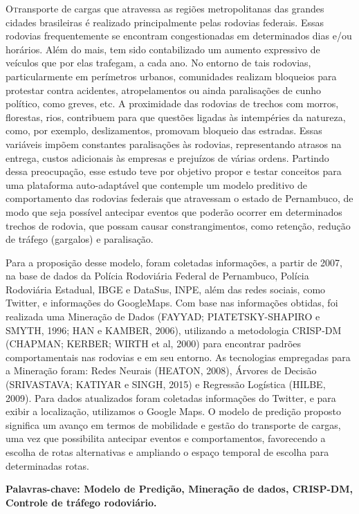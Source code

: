 \vspace*{12pt}

\lettrine {O}transporte de cargas que atravessa as regiões metropolitanas das grandes cidades brasileiras é realizado principalmente pelas rodovias federais. 
Essas rodovias frequentemente se encontram congestionadas em determinados dias e/ou horários.
Além do mais, tem sido contabilizado um aumento expressivo de veículos que por elas trafegam, a cada ano. No entorno de tais rodovias, particularmente em perímetros urbanos, comunidades realizam bloqueios para protestar contra acidentes, atropelamentos ou ainda paralisações de cunho político, como greves, etc.  A proximidade das rodovias de trechos com morros, florestas, rios, contribuem para que questões ligadas às intempéries da natureza, como, por exemplo, deslizamentos, promovam bloqueio das estradas. Essas variáveis impõem constantes paralisações às rodovias, representando atrasos na entrega, custos adicionais às empresas e prejuízos de várias ordens. 
Partindo dessa preocupação, esse estudo teve por objetivo propor e testar conceitos para uma plataforma auto-adaptável que 
contemple um modelo preditivo de comportamento das rodovias federais que atravessam o estado de Pernambuco, de modo que seja 
possível antecipar eventos que poderão ocorrer em determinados trechos de rodovia, que possam causar constrangimentos, 
como retenção, redução de tráfego (gargalos) e paralisação.

Para a proposição desse modelo, foram coletadas informações, a partir de 2007, na base de dados da Polícia Rodoviária Federal de Pernambuco, Polícia Rodoviária Estadual, IBGE e DataSus, INPE, além das redes sociais, como Twitter, e informações do GoogleMaps. 
Com base nas informações obtidas, foi realizada uma Mineração de Dados (FAYYAD; PIATETSKY-SHAPIRO e SMYTH, 1996; HAN e KAMBER, 2006), utilizando a metodologia CRISP-DM (CHAPMAN; KERBER; WIRTH et al, 2000) para encontrar padrões comportamentais nas rodovias e em seu entorno. As tecnologias empregadas para a Mineração foram: Redes Neurais (HEATON, 2008), Árvores de Decisão (SRIVASTAVA; KATIYAR e SINGH, 2015) e Regressão Logística (HILBE, 2009). 
Para dados atualizados foram coletadas informações do Twitter, e para exibir a localização, utilizamos o Google Maps.
O modelo de predição proposto significa um avanço em termos de mobilidade e gestão do transporte de cargas, uma vez que possibilita antecipar eventos e comportamentos, favorecendo a escolha de rotas alternativas e ampliando o espaço temporal de escolha para determinadas rotas.

\par
\vspace{2em}
\noindent\textbf{Palavras-chave: Modelo de Predição, Mineração de dados, CRISP-DM, Controle de tráfego rodoviário.}